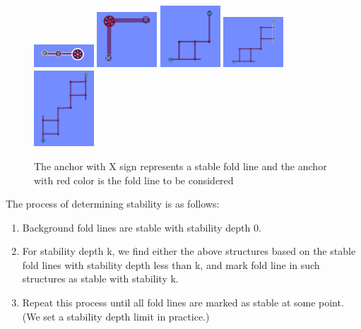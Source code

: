 \begin{figure}[h]
  \includegraphics[width = 0.2\textwidth]{Figures/stable_1}
  \includegraphics[width = 0.2\textwidth]{Figures/stable_2}
  \includegraphics[width = 0.2\textwidth]{Figures/stable_3}
  \includegraphics[width = 0.2\textwidth]{Figures/stable_4}
  \includegraphics[width = 0.2\textwidth]{Figures/stable_5}
  \caption{The anchor with X sign represents a stable fold line and the anchor with red color is the fold line to be considered}
  \label{fig:stable}
\end{figure}

The process of determining stability is as follows:
\begin{enumerate}
\item Background fold lines are stable with stability depth 0.
\item For stability depth k, we find either the above structures based on the stable fold lines with stability depth less than k, and mark fold line in such structures as stable with stability k.
\item Repeat this process until all fold lines are marked as stable at some point. (We set a stability depth limit in practice.)
\end{enumerate}